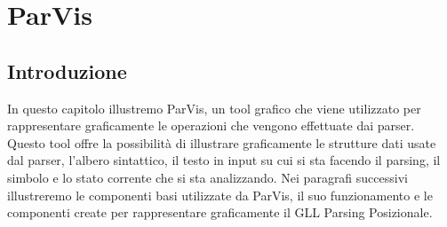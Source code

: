 \chapter{ParVis}
\section{Introduzione}
In questo capitolo illustremo ParVis, un tool grafico che viene utilizzato per rappresentare graficamente le operazioni che vengono effettuate dai parser. Questo tool offre la possibilità di illustrare graficamente le strutture dati usate dal parser, l'albero sintattico, il testo in input su cui si sta facendo il parsing, il simbolo e lo stato corrente che si sta analizzando. Nei paragrafi successivi illustreremo le componenti basi utilizzate da ParVis, il suo funzionamento e le componenti create per rappresentare graficamente il GLL Parsing Posizionale.
